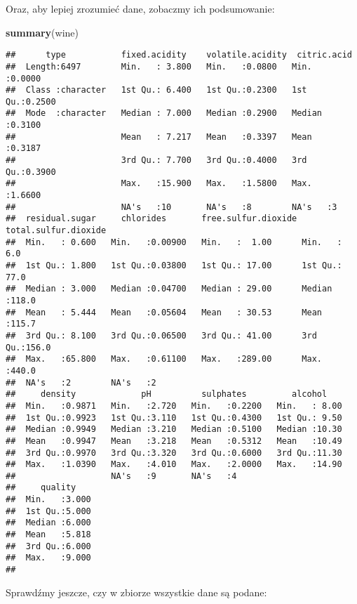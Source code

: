 \documentclass[
]{article}
\newenvironment{Shaded}{\begin{snugshade}}{\end{snugshade}}
\newcommand{\FunctionTok}[1]{\textcolor[rgb]{0.13,0.29,0.53}{\textbf{#1}}}
\newcommand{\NormalTok}[1]{#1}
\begin{document}
Oraz, aby lepiej zrozumieć dane, zobaczmy ich podsumowanie:

\begin{Shaded}
\begin{Highlighting}[]
\FunctionTok{summary}\NormalTok{(wine)}
\end{Highlighting}
\end{Shaded}

\begin{verbatim}
##      type           fixed.acidity    volatile.acidity  citric.acid    
##  Length:6497        Min.   : 3.800   Min.   :0.0800   Min.   :0.0000  
##  Class :character   1st Qu.: 6.400   1st Qu.:0.2300   1st Qu.:0.2500  
##  Mode  :character   Median : 7.000   Median :0.2900   Median :0.3100  
##                     Mean   : 7.217   Mean   :0.3397   Mean   :0.3187  
##                     3rd Qu.: 7.700   3rd Qu.:0.4000   3rd Qu.:0.3900  
##                     Max.   :15.900   Max.   :1.5800   Max.   :1.6600  
##                     NA's   :10       NA's   :8        NA's   :3       
##  residual.sugar     chlorides       free.sulfur.dioxide total.sulfur.dioxide
##  Min.   : 0.600   Min.   :0.00900   Min.   :  1.00      Min.   :  6.0       
##  1st Qu.: 1.800   1st Qu.:0.03800   1st Qu.: 17.00      1st Qu.: 77.0       
##  Median : 3.000   Median :0.04700   Median : 29.00      Median :118.0       
##  Mean   : 5.444   Mean   :0.05604   Mean   : 30.53      Mean   :115.7       
##  3rd Qu.: 8.100   3rd Qu.:0.06500   3rd Qu.: 41.00      3rd Qu.:156.0       
##  Max.   :65.800   Max.   :0.61100   Max.   :289.00      Max.   :440.0       
##  NA's   :2        NA's   :2                                                 
##     density             pH          sulphates         alcohol     
##  Min.   :0.9871   Min.   :2.720   Min.   :0.2200   Min.   : 8.00  
##  1st Qu.:0.9923   1st Qu.:3.110   1st Qu.:0.4300   1st Qu.: 9.50  
##  Median :0.9949   Median :3.210   Median :0.5100   Median :10.30  
##  Mean   :0.9947   Mean   :3.218   Mean   :0.5312   Mean   :10.49  
##  3rd Qu.:0.9970   3rd Qu.:3.320   3rd Qu.:0.6000   3rd Qu.:11.30  
##  Max.   :1.0390   Max.   :4.010   Max.   :2.0000   Max.   :14.90  
##                   NA's   :9       NA's   :4                       
##     quality     
##  Min.   :3.000  
##  1st Qu.:5.000  
##  Median :6.000  
##  Mean   :5.818  
##  3rd Qu.:6.000  
##  Max.   :9.000  
## 
\end{verbatim}

Sprawdźmy jeszcze, czy w zbiorze wszystkie dane są podane:
\end{document}
